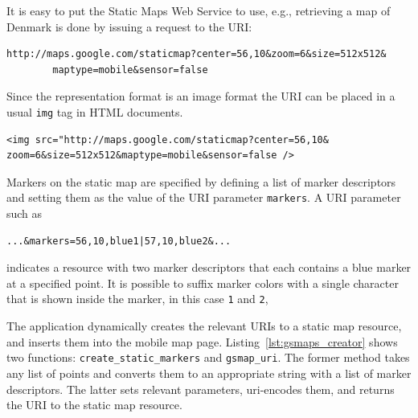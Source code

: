 It is easy to put the Static Maps Web Service to use, e.g., retrieving a map of
Denmark is done by issuing a request to the URI:
\begin{verbatim}
http://maps.google.com/staticmap?center=56,10&zoom=6&size=512x512&
        maptype=mobile&sensor=false  
\end{verbatim}
Since the representation format is an image format the URI can be placed in a
usual \verb|img| tag in HTML documents.
\begin{verbatim}
<img src="http://maps.google.com/staticmap?center=56,10&
zoom=6&size=512x512&maptype=mobile&sensor=false />  
\end{verbatim}
Markers on the static map are specified by defining a list of marker descriptors
and setting them as the value of the URI parameter \verb|markers|. A URI
parameter such as
\begin{verbatim}
...&markers=56,10,blue1|57,10,blue2&...
\end{verbatim}
indicates a resource with two marker descriptors that each contains a blue marker
at a specified point. It is possible to suffix marker colors with a single
character that is shown inside the marker, in this case \verb|1| and \verb|2|,

The application dynamically creates the relevant URIs to a static map resource,
and inserts them into the mobile map page. Listing~\ref{lst:gsmaps_creator} shows two
functions: \verb|create_static_markers| and \verb|gsmap_uri|. The former method
takes any list of points and converts them to an appropriate string with a list
of marker descriptors. The latter sets relevant parameters, uri-encodes them, and
returns the URI to the static map resource.

